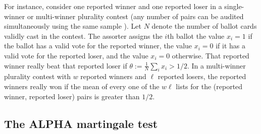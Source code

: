 \documentclass[12pt,runningheads]{llncs}
\begin{document}
{For instance, consider one reported winner and one reported loser in a single-winner or multi-winner plurality 
contest (any number of pairs can
be audited simultaneously using the same sample \cite{stark20}).
Let $N$ denote the number of ballot cards validly cast in the contest.
The assorter assigns the $i$th ballot the value $x_i=1$ if the ballot has a valid vote for the reported winner, 
the value $x_i=0$ if it has a valid vote for the reported loser, and the value $x_i=0$ otherwise.
That reported winner really beat that reported loser if $\theta := \frac{1}{N}\sum_i x_i > 1/2$.
In a multi-winner plurality contest with $w$ reported winners and $\ell$ reported losers,
the reported winners really won if the mean of every one of the $w\ell$ lists for the (reported winner, reported loser) pairs
is greater than $1/2$.

\subsection{The ALPHA martingale test}

}
\end{document}
